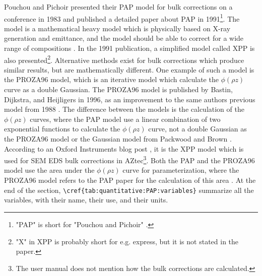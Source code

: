 Pouchou and Pichoir presented their PAP model for bulk corrections on a conference in 1983 and published a detailed paper about PAP in 1991\footnote{"PAP" is short for "Pouchou and Pichoir" \cite{pap_1991}.}.
The model is a mathematical heavy model which is physically based on X-ray generation and emittance, and the model should be able to correct for a wide range of compositions \cite{pap_1991}.
In the 1991 publication, a simplified model called XPP is also presented\footnote{"X" in XPP is probably short for e.g. express, but it is not stated in the paper.}.
Alternative methods exist for bulk corrections which produce similar results, but are mathematically different.
One example of such a model is the PROZA96 model, which is an iterative model which calculate the $\phi(\rho z)$ curve as a double Gaussian.
The PROZA96 model is published by Bastin, Dijkstra, and Heijligers in 1996, as an improvement to the same authors previous model from 1988 \cite{bastin_proza96_1998,bastin_proza_1988}.
The difference between the models is the calculation of the $\phi(\rho z)$ curves, where the PAP model use a linear combination of two exponential functions to calculate the $\phi(\rho z)$ curve, not a double Gaussian as the PROZA96 model or the Gaussian model from Packwood and Brown \cite{packwood_1981}.
According to an Oxford Instruments blog post \cite{oxford_blog_XPP}, it is the XPP model which is used for SEM EDS bulk corrections in AZtec\footnote{The user manual \cite{aztec_manual} does not mention how the bulk corrections are calculated.}.
Both the PAP and the PROZA96 model use the area under the $\phi(\rho z)$ curve for parameterization, where the PROZA96 model refers to the PAP paper for the calculation of this area \cite{bastin_proza96_1998}.
At the end of the section, \verb|\cref{tab:quantitative:PAP:variables}| summarize all the variables, with their name, their use, and their units.







